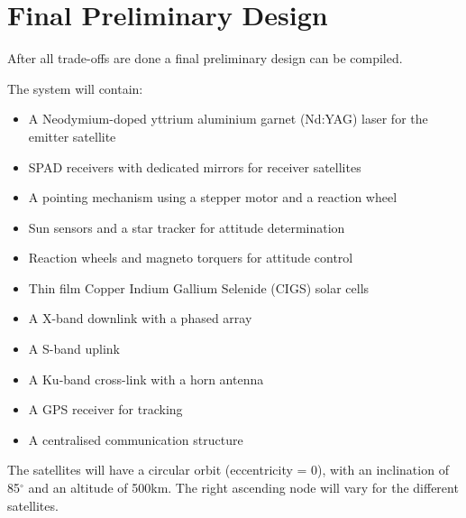 \section{Final Preliminary Design}
After all trade-offs are done a final preliminary design can be compiled. 

The system will contain:
\begin{itemize}
\item {A Neodymium-doped yttrium aluminium garnet (Nd:YAG) laser for the emitter satellite}
\item {\ac{SPAD} receivers with dedicated mirrors for receiver satellites}
\item {A pointing mechanism using a stepper motor and a reaction wheel}
\item {Sun sensors and a star tracker for attitude determination}
\item {Reaction wheels and magneto torquers for attitude control}
\item {Thin film Copper Indium Gallium Selenide (CIGS) solar cells}
\item {A X-band downlink with a phased array}
\item {A S-band uplink}
\item {A Ku-band cross-link with a horn antenna}
\item {A \ac{GPS} receiver for tracking}
\item {A centralised communication structure}
\end{itemize}

The satellites will have a circular orbit (eccentricity = 0), with an inclination of 85${}^\circ$ and an altitude of 500km. The right ascending node will vary for the different satellites.
